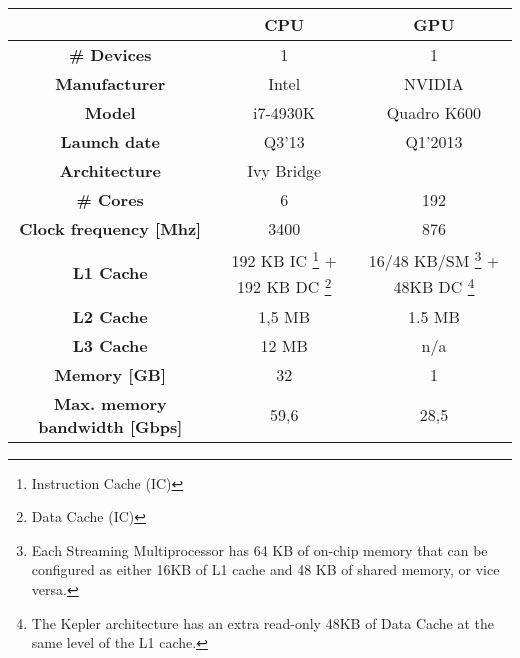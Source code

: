 \begin{minipage}[h]{\hsize}
	\centering
	\begin{tabular}{ccc}
		\toprule[2pt]
												 & \textbf{CPU}      & \textbf{GPU} \\ \midrule
		\textbf{\# Devices}                      & 1                 & 1            \\ 
		\textbf{Manufacturer}                    & Intel             & NVIDIA       \\ 
		\textbf{Model}                           & i7-4930K          & Quadro K600      \\ 
		\textbf{Launch date}                     & Q3'13             & Q1'2013      \\ 
		\textbf{Architecture}                    & Ivy Bridge      &         \\ 
		\textbf{\# Cores}                        & 6                 & 192           \\ 
		\textbf{Clock frequency {[}Mhz{]}}       & 3400              & 876         \\ 
		\textbf{L1 Cache}                        & 192 KB IC \footnote{Instruction Cache (IC)} + 192 KB DC \footnote{Data Cache (IC)} & 16/48 KB/SM \footnote{Each Streaming Multiprocessor has 64 KB of on-chip memory that can be configured as either 16KB of L1 cache and 48 KB of shared memory, or vice versa.} + 48KB DC \footnote{The Kepler architecture has an extra read-only 48KB of Data Cache at the same level of the L1 cache.} \\ 
		\textbf{L2 Cache}                        & 1,5 MB             & 1.5 MB         \\ 
		\textbf{L3 Cache}                        & 12 MB              & n/a          \\ 
		\textbf{Memory {[}GB{]}}                 & 32                & 1            \\ 
		\textbf{Max. memory bandwidth {[}Gbps{]}} & 59,6              & 28,5        \\ 
		\bottomrule[2pt]
	\end{tabular}
	\label{tab:charlie}
\end{minipage}